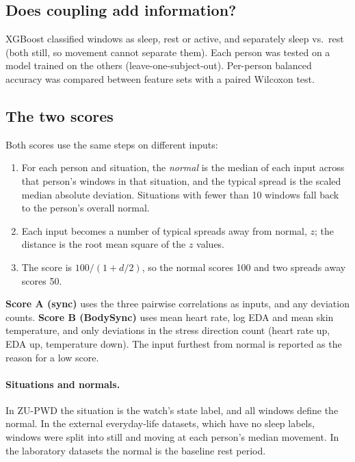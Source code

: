 \documentclass{article}
\begin{document}
\subsection{Does coupling add information?}
XGBoost classified windows as sleep, rest or active, and separately sleep vs.\ rest (both still, so movement cannot separate them). Each person was tested on a model trained on the others (leave-one-subject-out). Per-person balanced accuracy was compared between feature sets with a paired Wilcoxon test.

\subsection{The two scores}
Both scores use the same steps on different inputs:
\begin{enumerate}
\item For each person and situation, the \emph{normal} is the median of each input across that person's windows in that situation, and the typical spread is the scaled median absolute deviation. Situations with fewer than 10 windows fall back to the person's overall normal.
\item Each input becomes a number of typical spreads away from normal, $z$; the distance is the root mean square of the $z$ values.
\item The score is $100 / (1 + d/2)$, so the normal scores 100 and two spreads away scores 50.
\end{enumerate}
\textbf{Score A (sync)} uses the three pairwise correlations as inputs, and any deviation counts. \textbf{Score B (BodySync)} uses mean heart rate, log EDA and mean skin temperature, and only deviations in the stress direction count (heart rate up, EDA up, temperature down). The input furthest from normal is reported as the reason for a low score.

\paragraph{Situations and normals.} In ZU-PWD the situation is the watch's state label, and all windows define the normal. In the external everyday-life datasets, which have no sleep labels, windows were split into still and moving at each person's median movement. In the laboratory datasets the normal is the baseline rest period.
\end{document}
